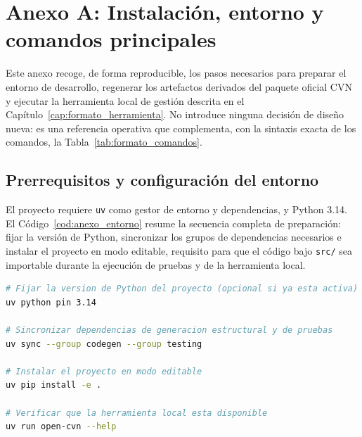 \chapter*{Anexo A: Instalación, entorno y comandos principales}
\label{cap:anexo_instalacion}

\setcounter{section}{0}
\renewcommand{\thesection}{A.\arabic{section}}
\setcounter{code}{0}
\renewcommand{\thecode}{A.\arabic{code}}

Este anexo recoge, de forma reproducible, los pasos necesarios para preparar
el entorno de desarrollo, regenerar los artefactos derivados del paquete
oficial CVN y ejecutar la herramienta local de gestión descrita en el
Capítulo~\ref{cap:formato_herramienta}. No introduce ninguna decisión de
diseño nueva: es una referencia operativa que complementa, con la sintaxis
exacta de los comandos, la Tabla~\ref{tab:formato_comandos}.

\section{Prerrequisitos y configuración del entorno}
\label{sec:anexo_instalacion_entorno}

El proyecto requiere \texttt{uv} como gestor de entorno y dependencias, y
Python 3.14. El Código~\ref{cod:anexo_entorno} resume la secuencia completa
de preparación: fijar la versión de Python, sincronizar los grupos de
dependencias necesarios e instalar el proyecto en modo editable, requisito
para que el código bajo \texttt{src/} sea importable durante la ejecución de
pruebas y de la herramienta local.

\begin{code}[htbp]
\begin{lstlisting}[language=bash, basicstyle=\footnotesize\ttfamily, breaklines=true]
# Fijar la version de Python del proyecto (opcional si ya esta activa)
uv python pin 3.14

# Sincronizar dependencias de generacion estructural y de pruebas
uv sync --group codegen --group testing

# Instalar el proyecto en modo editable
uv pip install -e .

# Verificar que la herramienta local esta disponible
uv run open-cvn --help
\end{lstlisting}
\caption{Preparación del entorno de desarrollo.}
\label{cod:anexo_entorno}
\end{code}

